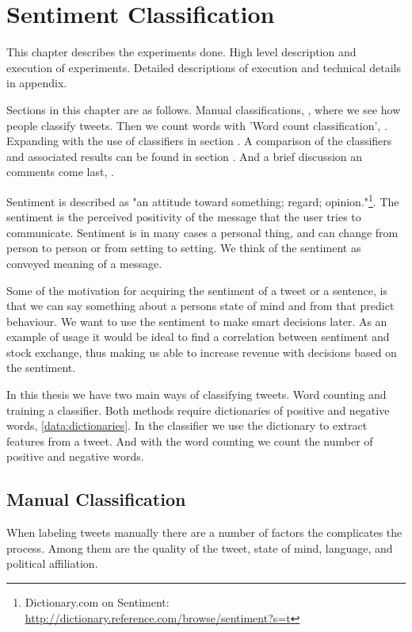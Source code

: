 \chapter{Sentiment Classification}\label{sentiment}
This chapter describes the experiments done. High level description and
execution of experiments. Detailed descriptions of execution and technical
details in appendix. 

Sections in this chapter are as follows. Manual classifications,
\label{sentiment:manual_classification}, where we see how people classify
tweets. Then we count words with 'Word count classification',
\label{sentiment:word_count_classification}. Expanding with the use of
classifiers in section \label{sentiment:classifier_classification}. A
comparison of the classifiers and associated results can be found in section
\label{sentiment:comparison_results}. And a brief discussion an comments come
last, \label{sentiment:comments_discussion}.

Sentiment is described as "an attitude toward something; regard;
opinion."\footnote{ Dictionary.com on Sentiment:
\url{http://dictionary.reference.com/browse/sentiment?s=t}}. The sentiment is the perceived positivity of the message that the user tries to
communicate. Sentiment is in many cases a personal thing, and can change from
person to person or from setting to setting. We think of the sentiment as
conveyed meaning of a message. 

Some of the motivation for acquiring the sentiment of a tweet or a sentence, is
that we can say something about a persons state of mind and from that predict
behaviour. We want to use the sentiment to make smart decisions later. As an
example of usage it would be ideal to find a correlation between sentiment and
stock exchange, thus making us able to increase revenue with decisions
based on the sentiment. 

In this thesis we have two main ways of classifying tweets. Word counting and
training a classifier. Both methods require dictionaries of positive and
negative words, \ref{data:dictionaries}. In the classifier we use the dictionary
to extract features from a tweet. And with the word counting we count the
number of positive and negative words. 

\section{Manual Classification}\label{sentiment:manual_classification}
When labeling tweets manually there are a number of factors the complicates the
process. Among them are the quality of the tweet, state of mind, language, and
political affiliation.

